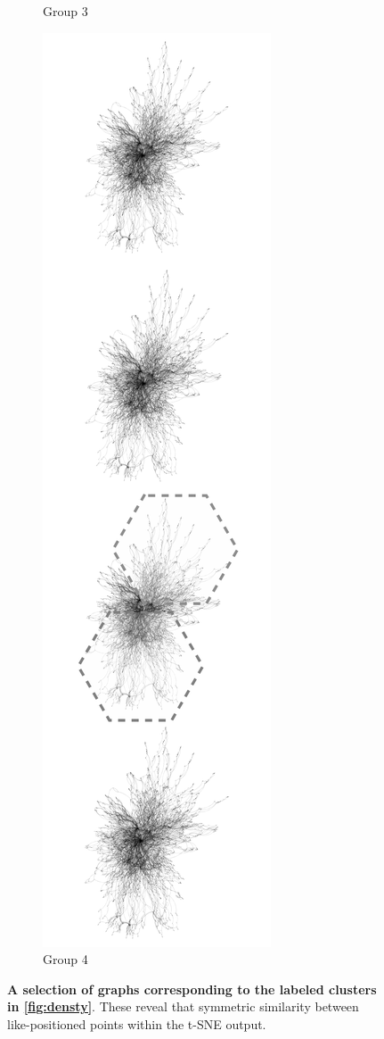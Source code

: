 \begin{figure}[H]
\begin{subfigure}[b]{.2\textwidth}
     \caption{Group 3}
     \end{subfigure}
     \begin{subfigure}[b]{.2\textwidth}
         \centering
     \includegraphics[width=\textwidth]{figures_c1/beijingtest/4.png}
     \caption{Group 4}
     \end{subfigure}
        \caption{\textbf{A selection of graphs corresponding to the labeled clusters in \autoref{fig:densty}}. These reveal that symmetric similarity between like-positioned points within the t-SNE output.  }
      \label{fig:densitypic}
\end{figure}

